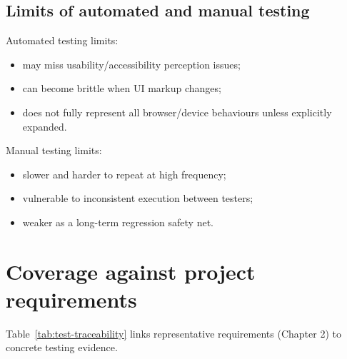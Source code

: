 \subsection{Limits of automated and manual testing}

	Automated testing limits:
\begin{itemize}
	\item may miss usability/accessibility perception issues;
	\item can become brittle when UI markup changes;
	\item does not fully represent all browser/device behaviours unless explicitly expanded.
\end{itemize}

	Manual testing limits:
\begin{itemize}
	\item slower and harder to repeat at high frequency;
	\item vulnerable to inconsistent execution between testers;
	\item weaker as a long-term regression safety net.
\end{itemize}

\section{Coverage against project requirements}

Table~\ref{tab:test-traceability} links representative requirements (Chapter 2) to concrete testing evidence.

